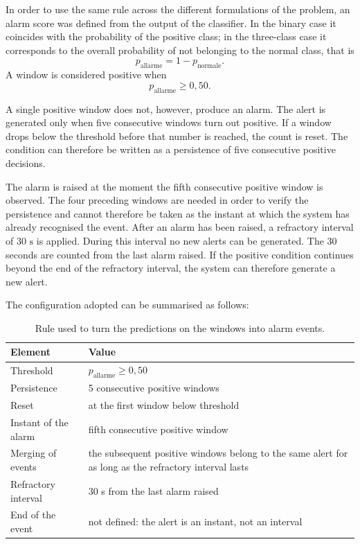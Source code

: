 In order to use the same rule across the different formulations of the problem, an alarm score was defined from the output of the classifier. In the binary case it coincides with the probability of the positive class; in the three-class case it corresponds to the overall probability of not belonging to the normal class, that is
\[ p_{\mathrm{allarme}} = 1-p_{\mathrm{normale}}. \]
A window is considered positive when
\[ p_{\mathrm{allarme}} \geq 0{,}50. \]

A single positive window does not, however, produce an alarm. The alert is generated only when five consecutive windows turn out positive. If a window drops below the threshold before that number is reached, the count is reset. The condition can therefore be written as a persistence of five consecutive positive decisions.

The alarm is raised at the moment the fifth consecutive positive window is observed. The four preceding windows are needed in order to verify the persistence and cannot therefore be taken as the instant at which the system has already recognised the event. After an alarm has been raised, a refractory interval of $30\text{ s}$ is applied. During this interval no new alerts can be generated. The 30 seconds are counted from the last alarm raised. If the positive condition continues beyond the end of the refractory interval, the system can therefore generate a new alert.

The configuration adopted can be summarised as follows: \begin{table}[htbp]
\centering
\caption{Rule used to turn the predictions on the windows into
alarm events.}
\label{tab:allarme}
\begin{tabular}{@{}p{4.5cm}p{8.5cm}@{}}
\toprule
\textbf{Element} & \textbf{Value} \\
\midrule
Threshold & \(p_{\mathrm{allarme}}\geq0{,}50\) \\
Persistence & 5 consecutive positive windows \\
Reset & at the first window below threshold \\
Instant of the alarm & fifth consecutive positive window \\
Merging of events & the subsequent positive windows belong to the same alert for as long as the refractory interval lasts \\
Refractory interval & 30 s from the last alarm raised \\
End of the event & not defined: the alert is an instant, not an interval \\
\bottomrule
\end{tabular}
\end{table}

